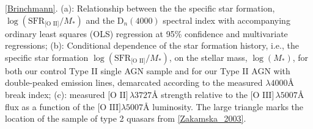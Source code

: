 \label{Brinchmann} \ref{Brinchmann}. (a): Relationship between the the specific star formation, $\log{(\text{SFR}_{\text{[O II]}}/M_{*})}$ and the $\text{D}_{n}(4000)$ spectral index with accompanying ordinary least squares (OLS) regression at 95\% confidence and multivariate regressions; (b): Conditional dependence of the star formation history, i.e., the specific star formation $\log{(\text{SFR}_{\text{[O II]}}/M_{*})}$, on the stellar mass, $\log{(M_{*})}$, for both our control Type II single AGN sample and for our Type II AGN with double-peaked emission lines, demarcated according to the measured $\lambda{4000}Å$ break index; (c): measured $\text{[O II]}\,\lambda{3727}Å$ strength relative to the $\text{[O III]}\,\lambda{5007}Å$ flux as a function of the $\text{[O III]}\lambda5007Å$ luminosity. The large triangle marks the location of the sample of type 2 quasars from \ref{Zakamska_2003}.
  
  
  